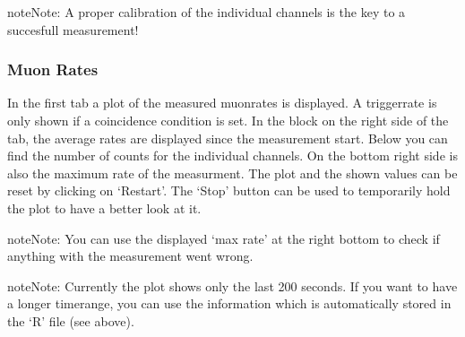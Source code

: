\documentclass[letterpaper,10pt,english]{sphinxmanual}
\begin{document}
\begin{notice}{note}{Note:}
A proper calibration of the individual channels is the key to a succesfull measurement!
\end{notice}


\subsubsection{Muon Rates}
\label{tutorial:muon-rates}
In the first tab a plot of the measured muonrates is displayed. A triggerrate is only shown if a coincidence condition is set.
In the block on the right side of the tab, the average rates are displayed since the measurement start. Below you can find the number of counts for the individual channels. On the bottom right side is also the maximum rate of the measurment. The plot and the shown values can be reset by clicking on `Restart'. The `Stop' button can be used to temporarily hold the plot to have a better look at it.

\begin{notice}{note}{Note:}
You can use the displayed `max rate' at the right bottom to check if anything with the measurement went wrong.
\end{notice}

\begin{notice}{note}{Note:}
Currently the plot shows only the last 200 seconds. If you want to have a longer timerange, you can use the information which is automatically stored in the `R' file (see above).
\end{notice}
\end{document}
